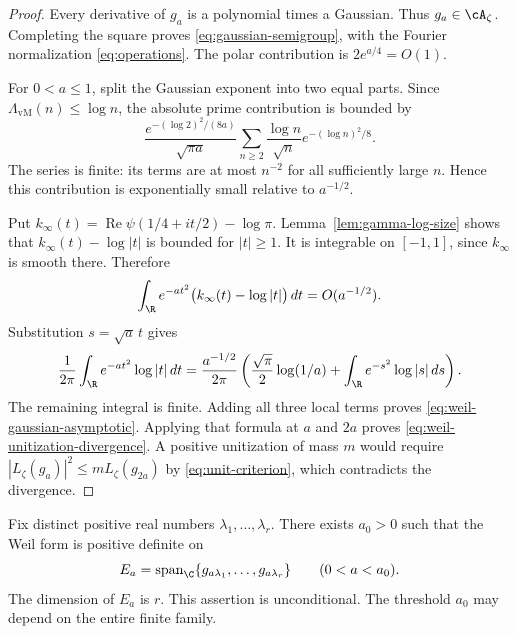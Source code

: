 \begin{proof}
Every derivative of $g_a$ is a polynomial times a Gaussian.
Thus $g_a\in\cA_\zeta$.  Completing the square proves
\eqref{eq:gaussian-semigroup}, with the Fourier normalization
\eqref{eq:operations}.
The polar contribution is $2e^{a/4}=O(1)$.

For $0<a\leq1$, split the Gaussian exponent into two equal parts.
Since $\Lambda_{\mathrm{vM}}(n)\leq\log n$, the absolute prime contribution
is bounded by
\begin{equation}
 \frac{e^{-(\log2)^2/(8a)}}{\sqrt{\pi a}}
 \sum_{n\geq2}\frac{\log n}{\sqrt n}
                       e^{-(\log n)^2/8}.
 \label{eq:prime-gaussian-bound}
\end{equation}
The series is finite: its terms are at most $n^{-2}$ for all sufficiently
large $n$.  Hence this contribution is exponentially small relative to
$a^{-1/2}$.

Put $k_\infty(t)=\operatorname{Re}\psi(1/4+it/2)-\log\pi$.
Lemma~\ref{lem:gamma-log-size} shows that
$k_\infty(t)-\log|t|$ is bounded for $|t|\geq1$.
It is integrable on $[-1,1]$, since $k_\infty$ is smooth there.
Therefore
\[
 \int_{\R}e^{-at^2}\bigl(k_\infty(t)-\log|t|\bigr)\,dt
 =O(a^{-1/2}).
\]
Substitution $s=\sqrt a\,t$ gives
\[
 \frac1{2\pi}\int_{\R}e^{-at^2}\log|t|\,dt
 =\frac{a^{-1/2}}{2\pi}
 \left(\frac{\sqrt\pi}{2}\log(1/a)
          +\int_{\R}e^{-s^2}\log|s|\,ds\right).
\]
The remaining integral is finite.  Adding all three local terms proves
\eqref{eq:weil-gaussian-asymptotic}.
Applying that formula at $a$ and $2a$ proves
\eqref{eq:weil-unitization-divergence}.
A positive unitization of mass $m$ would require
$|L_\zeta(g_a)|^2\leq mL_\zeta(g_{2a})$ by
\eqref{eq:unit-criterion}, which contradicts the divergence.
\end{proof}

\begin{theorem}
\label{thm:gaussian-subspaces}
Fix distinct positive real numbers $\lambda_1,\ldots,\lambda_r$.
There exists $a_0>0$ such that the Weil form is positive definite on
\[
 E_a=\operatorname{span}_{\C}\{g_{a\lambda_1},\ldots,g_{a\lambda_r}\}
 \qquad(0<a<a_0).
\]
The dimension of $E_a$ is $r$.  This assertion is unconditional.
The threshold $a_0$ may depend on the entire finite family.
\end{theorem}

